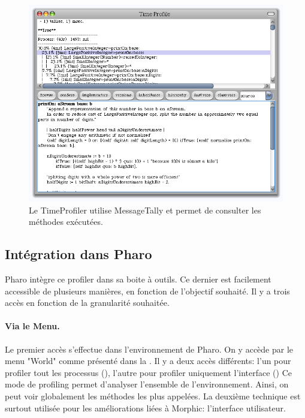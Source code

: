 \documentclass[a4paper,10pt,twoside]{book}
\begin{document}
\begin{figure}
	\begin{center}
	\includegraphics[width=.8\linewidth]{TimeProfiler}
	\caption{Le TimeProfiler utilise MessageTally et permet de consulter les m\'ethodes ex\'ecut\'ees.
	}
	\end{center}
\end{figure}


\subsection{Int\'egration dans Pharo}
Pharo int\`egre ce profiler dans sa boite \`a outils. Ce dernier est facilement accessible de plusieurs mani\`eres, en fonction de l'objectif souhait\'e. Il y a trois acc\`es en fonction de la granularit\'e souhait\'ee.

\paragraph{Via le Menu.}
Le premier acc\`es s'effectue dans l'environnement de Pharo. On y acc\`ede par le menu "World" comme pr\'esent\'e dans la . Il y a deux acc\`es diff\'erents: l'un pour profiler tout les processus (), l'autre pour profiler uniquement l'interface ()
Ce mode de profiling permet d'analyser l'ensemble de l'environnement. Ainsi, on peut voir globalement les m\'ethodes les plus appel\'ees. La deuxi\`eme technique est surtout utilis\'ee pour les am\'eliorations li\'ees \`a Morphic: l'interface utilisateur.
\end{document}
